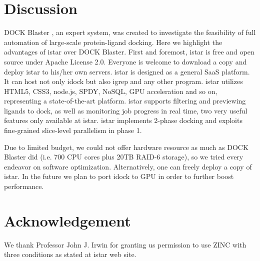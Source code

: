 \documentclass{bioinfo}
\begin{document}
\section{Discussion}

DOCK Blaster \citep{557}, an expert system, was created to investigate the feasibility of full automation of large-scale protein-ligand docking. Here we highlight the advantages of istar over DOCK Blaster. First and foremost, istar is free and open source under Apache License 2.0. Everyone is welcome to download a copy and deploy istar to his/her own servers. istar is designed as a general SaaS platform. It can host not only idock but also igrep and any other program. istar utilizes HTML5, CSS3, node.js, SPDY, NoSQL, GPU acceleration and so on, representing a state-of-the-art platform. istar supports filtering and previewing ligands to dock, as well as monitoring job progress in real time, two very useful features only available at istar. istar implements 2-phase docking and exploits fine-grained slice-level parallelism in phase 1.

Due to limited budget, we could not offer hardware resource as much as DOCK Blaster did (i.e. 700 CPU cores plus 20TB RAID-6 storage), so we tried every endeavor on software optimization. Alternatively, one can freely deploy a copy of istar. In the future we plan to port idock to GPU in order to further boost performance.

\section*{Acknowledgement}

We thank Professor John J. Irwin for granting us permission to use ZINC with three conditions as stated at istar web site.



\end{document}
